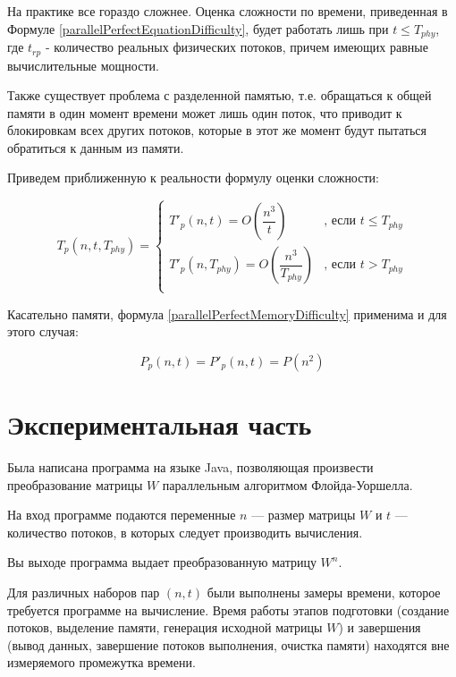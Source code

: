 \documentclass{article}
\begin{document}
			На практике все гораздо сложнее. Оценка сложности по времени, приведенная в Формуле \ref{parallelPerfectEquationDifficulty}, будет работать лишь при $t \leq T_{phy}$, где $t_{rp}$ - количество реальных физических потоков, причем имеющих равные вычислительные мощности.		
			
			Также существует проблема с разделенной памятью, т.е. обращаться к общей памяти в один момент времени может лишь один поток, что приводит к блокировкам всех других потоков, которые в этот же момент будут пытаться обратиться к данным из памяти.
			
			Приведем приближенную к реальности формулу оценки сложности:
			
			\begin{equation}\label{parallelRealEquationDifficulty}
				T_p(n,t,T_{phy}) = 
				\left\{
					\begin{array}{ll}
						T'_p(n,t) = O\left( \dfrac{n^3}{t} \right) 
						& \mbox{, если } t \leq T_{phy} 
						\\ 
						T'_p(n,T_{phy}) = O\left( \dfrac{n^3}{T_{phy}} \right)  
						& \mbox{, если } t > T_{phy} \\
					\end{array}
				\right.
			\end{equation}
			
			Касательно памяти, формула \ref{parallelPerfectMemoryDifficulty} применима и для этого случая:
			
			$$
				P_p(n,t) = P'_p(n,t) = P(n^2)
			$$
			
\section{Экспериментальная часть}

	Была написана программа на языке Java, позволяющая произвести преобразование матрицы $W$ параллельным алгоритмом Флойда-Уоршелла. 
	
	На вход программе подаются переменные $n$ --- размер матрицы $W$ и $t$ --- количество потоков, в которых следует производить вычисления.
	
	Вы выходе программа выдает преобразованную матрицу $W^n$.
	
	Для различных наборов пар $(n,t)$ были выполнены замеры времени, которое требуется программе на вычисление. Время работы этапов подготовки (создание потоков, выделение памяти, генерация исходной матрицы $W$) и завершения (вывод данных, завершение потоков выполнения, очистка памяти) находятся вне измеряемого промежутка времени.
	
\end{document}
